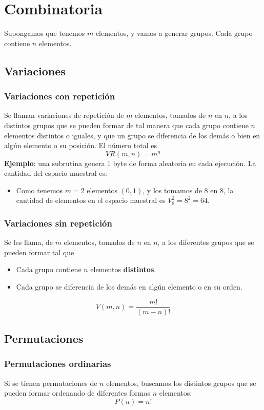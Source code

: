 \documentclass{./Probabilidad.tex}
\begin{document}
\chapter{Combinatoria}
Supongamos que tenemos $m$ elementos, y vamos a generar grupos. Cada grupo contiene $n$ elementos.
\section{Variaciones}
\subsection{Variaciones con repetición}
Se llaman variaciones de repetición de $m$ elementos, tomados de $n$ en $n$, a los distintos grupos que se pueden formar de tal manera que cada grupo contiene $n$ elementos distintos o iguales, y que un grupo se diferencia de los demás o bien en algún elemento o su posición.
El número total es
$$
VR(m,n)=m^{n}
$$
\textbf{Ejemplo}: una subrutina genera $1$ byte de forma aleatoria en cada ejecución. La cantidad del espacio muestral es:\\
\begin{itemize}
	\item Como tenemos $m=2$ elementos $(0,1)$, y los tomamos de $8$ en $8$, la cantidad de elementos en el espacio muestral es $V_{8}^{2}=8^{2}=64$.     
\end{itemize}
\subsection{Variaciones sin repetición}
Se les llama, de $m$ elementos, tomados de $n$ en $n$, a los diferentes grupos que se pueden formar tal que
\begin{itemize}
	\item Cada grupo contiene $n$ elementos \textbf{distintos}.
	\item Cada grupo se diferencia de los demás en algún elemento o en su orden.
\end{itemize}
$$
V(m,n)=\frac{m!}{(m-n)!}
$$
\section{Permutaciones}
\subsection{Permutaciones ordinarias}
Si se tienen permutaciones de $n$ elementos, buscamos los distintos grupos que se pueden formar ordenando de diferentes formas $n$ elementos:
$$
P(n)=n!
$$
\end{document}

